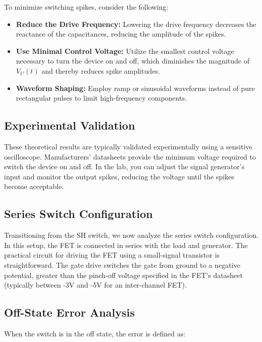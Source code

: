To minimize switching spikes, consider the following:

\begin{itemize}
    \item \textbf{Reduce the Drive Frequency:} Lowering the drive frequency decreases the reactance of the capacitances, reducing the amplitude of the spikes.
    
    \item \textbf{Use Minimal Control Voltage:} Utilize the smallest control voltage necessary to turn the device on and off, which diminishes the magnitude of \( V_C(t) \) and thereby reduces spike amplitudes.
    
    \item \textbf{Waveform Shaping:} Employ ramp or sinusoidal waveforms instead of pure rectangular pulses to limit high-frequency components.
\end{itemize}

\subsection{Experimental Validation}

These theoretical results are typically validated experimentally using a sensitive oscilloscope. Manufacturers' datasheets provide the minimum voltage required to switch the device on and off. In the lab, you can adjust the signal generator's input and monitor the output spikes, reducing the voltage until the spikes become acceptable.

\subsection{Series Switch Configuration}

Transitioning from the SH switch, we now analyze the series switch configuration. In this setup, the FET is connected in series with the load and generator. The practical circuit for driving the FET using a small-signal transistor is straightforward. The gate drive switches the gate from ground to a negative potential, greater than the pinch-off voltage specified in the FET's datasheet (typically between -3V and -5V for an inter-channel FET).

\subsection{Off-State Error Analysis}

When the switch is in the off state, the error is defined as:

